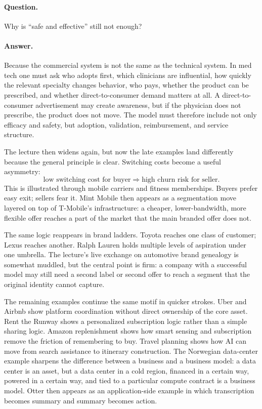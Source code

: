 \paragraph{Question.} Why is ``safe and effective'' still not enough?

\paragraph{Answer.} Because the commercial system is not the same as the technical system. In med tech one must ask who adopts first, which clinicians are influential, how quickly the relevant specialty changes behavior, who pays, whether the product can be prescribed, and whether direct-to-consumer demand matters at all. A direct-to-consumer advertisement may create awareness, but if the physician does not prescribe, the product does not move. The model must therefore include not only efficacy and safety, but adoption, validation, reimbursement, and service structure.

The lecture then widens again, but now the late examples land differently because the general principle is clear. Switching costs become a useful asymmetry:
\begin{equation}
\text{low switching cost for buyer}
\Rightarrow
\text{high churn risk for seller}.
\end{equation}
This is illustrated through mobile carriers and fitness memberships. Buyers prefer easy exit; sellers fear it. Mint Mobile then appears as a segmentation move layered on top of T-Mobile's infrastructure: a cheaper, lower-bandwidth, more flexible offer reaches a part of the market that the main branded offer does not.

The same logic reappears in brand ladders. Toyota reaches one class of customer; Lexus reaches another. Ralph Lauren holds multiple levels of aspiration under one umbrella. The lecture's live exchange on automotive brand genealogy is somewhat muddled, but the central point is firm: a company with a successful model may still need a second label or second offer to reach a segment that the original identity cannot capture.

The remaining examples continue the same motif in quicker strokes. Uber and Airbnb show platform coordination without direct ownership of the core asset. Rent the Runway shows a personalized subscription logic rather than a simple sharing logic. Amazon replenishment shows how smart sensing and subscription remove the friction of remembering to buy. Travel planning shows how AI can move from search assistance to itinerary construction. The Norwegian data-center example sharpens the difference between a business and a business model: a data center is an asset, but a data center in a cold region, financed in a certain way, powered in a certain way, and tied to a particular compute contract is a business model. Otter then appears as an application-side example in which transcription becomes summary and summary becomes action.

